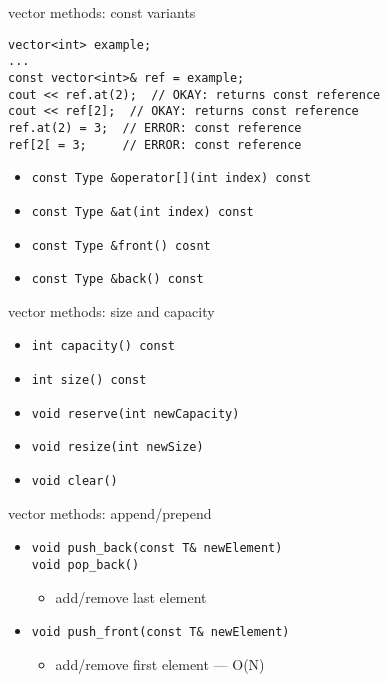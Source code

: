     \begin{frame}[fragile,label=vectMethConst]{vector methods: const variants}
\lstset{
    language=C++,
    style=small
}
\begin{lstlisting}
vector<int> example;
...
const vector<int>& ref = example;
cout << ref.at(2);  // OKAY: returns const reference
cout << ref[2];  // OKAY: returns const reference
ref.at(2) = 3;  // ERROR: const reference
ref[2[ = 3;     // ERROR: const reference
\end{lstlisting}
\begin{itemize}
\item \lstinline|const Type &operator[](int index) const|
\item \lstinline|const Type &at(int index) const|
\item \lstinline|const Type &front() cosnt|
\item \lstinline|const Type &back() const|
\end{itemize}
\end{frame}

    \begin{frame}[fragile,label=vectMethSize]{vector methods: size and capacity}
\lstset{
    language=C++,
    style=small
}
\begin{itemize}
\item \lstinline|int capacity() const|
\item \lstinline|int size() const|
\item \lstinline|void reserve(int newCapacity)|
\item \lstinline|void resize(int newSize)|
\item \lstinline|void clear()|
\end{itemize}
\end{frame}


    \begin{frame}[fragile,label=vectMethApp]{vector methods: append/prepend}
\lstset{
    language=C++,
    style=small
}
\begin{itemize}
\item \lstinline|void push_back(const T& newElement)| \\
      \lstinline|void pop_back()|
\begin{itemize}\item add/remove last element\end{itemize}
\item \lstinline|void push_front(const T& newElement)|
\begin{itemize}\item add/remove first element --- O(N)\end{itemize}
\end{itemize}
\end{frame}
